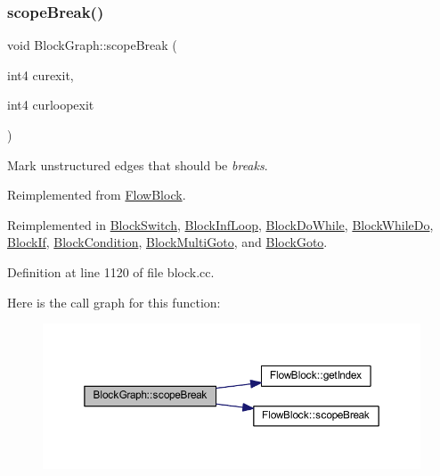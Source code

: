 \subsubsection{\texorpdfstring{scopeBreak()}{scopeBreak()}}
{\footnotesize\ttfamily void Block\+Graph\+::scope\+Break (\begin{DoxyParamCaption}\item[{int4}]{curexit,  }\item[{int4}]{curloopexit }\end{DoxyParamCaption})\hspace{0.3cm}{\ttfamily [virtual]}}



Mark unstructured edges that should be {\itshape breaks}. 



Reimplemented from \mbox{\hyperlink{class_flow_block_a392611cfd24306f58ea6e18371809223}{Flow\+Block}}.



Reimplemented in \mbox{\hyperlink{class_block_switch_a85ad912114b4e2ac355ac2bc2f3be12c}{Block\+Switch}}, \mbox{\hyperlink{class_block_inf_loop_ad1f92e4b37d7bf19cc409d353ad281ae}{Block\+Inf\+Loop}}, \mbox{\hyperlink{class_block_do_while_a6a6254c0020641ccffd791f6206461cc}{Block\+Do\+While}}, \mbox{\hyperlink{class_block_while_do_a87ab7a000da06ffdca299db53495eae0}{Block\+While\+Do}}, \mbox{\hyperlink{class_block_if_afeafc0ad59b47dde90d4b477a2ef7637}{Block\+If}}, \mbox{\hyperlink{class_block_condition_ab25a80cf066d355146cd5b4a67d91f46}{Block\+Condition}}, \mbox{\hyperlink{class_block_multi_goto_a1957286b0a3a4a2d280caae3c1f19cc7}{Block\+Multi\+Goto}}, and \mbox{\hyperlink{class_block_goto_ad409112a4ad46f076a923bd152428a83}{Block\+Goto}}.



Definition at line 1120 of file block.\+cc.

Here is the call graph for this function\+:
\nopagebreak
\begin{figure}[H]
\begin{center}
\leavevmode
\includegraphics[width=350pt]{class_block_graph_a55618dfd49266bd4185d119f08e8b630_cgraph}
\end{center}
\end{figure}
\mbox{\label{class_block_graph_a8bc1763c69f71a1c6a088340ae4a256f}} 
